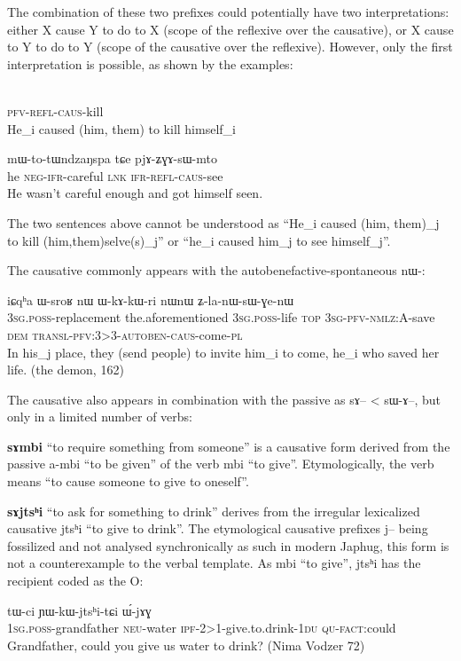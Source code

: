 \documentclass[oldfontcommands,oneside,a4paper,11pt]{article}
\newcommand{\ipa}[1]{{\phon \mbox{#1}}} %
\newcommand{\sg}{\textsc{sg}}
\newcommand{\pl}{\textsc{pl}}
\newcommand{\wav}[1]{}%
\newcommand{\pfv}{\textsc{pfv}}
\newcommand{\auto}{\textsc{autoben}}
\newcommand{\caus}{\textsc{caus}}
\newcommand{\lnk}{\textsc{lnk}}
\newcommand{\dem}{\textsc{dem}}
\newcommand{\du}{\textsc{du}}
\newcommand{\evd}{\textsc{ifr}}
\newcommand{\ipf}{\textsc{ipf}}
\newcommand{\negat}{\textsc{neg}}
\newcommand{\neu}{\textsc{neu}}
\newcommand{\nmlz}{\textsc{nmlz}}
\newcommand{\fact}{\textsc{fact}}
\newcommand{\poss}{\textsc{poss}}
\newcommand{\qu}{\textsc{qu}}
\newcommand{\refl}{\textsc{refl}}
\newcommand{\topic}{\textsc{top}}
\newcommand{\transloc}{\textsc{transl}}
\begin{document}
 The combination of these two prefixes could potentially have two interpretations: either X cause Y to do to X (scope of the reflexive over the causative), or X cause to Y to do to Y (scope of the causative over the reflexive). However, only the first interpretation is possible, as shown by the examples:
\begin{exe}
\ex 
\gll \ipa{pɯ-ʑɣɤ-sɯ-sat}  \\
  \pfv{}-\refl{}-\caus{}-kill \\
\glt   He_i caused (him, them) to kill himself_i
\end{exe}
	\begin{exe}
\ex 
\gll \ipa{ɯʑo} 	\ipa{mɯ-to-tɯndzaŋspa} 	\ipa{tɕe} 	\ipa{pjɤ-ʑɣɤ-sɯ-mto} \\
 he \negat{}-\evd{}-careful \lnk{} \evd{}-\refl{}-\caus{}-see \\
\glt   He wasn't careful enough and got himself seen. \wav{8_ZGAsWmto}
\end{exe}

The two sentences above cannot be understood as  ``He_i caused (him, them)_j to kill (him,them)selve(s)_j'' or ``he_i caused him_j to see himself_j''.


The causative commonly appears with the autobenefactive-spontaneous \ipa{nɯ-}:


 \begin{exe}
\ex 
\gll \ipa{ɯ-sci} 	\ipa{iɕqʰa} 	\ipa{ɯ-sroʁ} 	\ipa{nɯ} 	\ipa{ɯ-kɤ-kɯ-ri} 	\ipa{nɯnɯ} \ipa{ʑ-la-nɯ-sɯ-ɣe-nɯ} \\
3\sg{}.\poss{}-replacement the.aforementioned 3\sg{}.\poss{}-life \topic{} 3\sg{}-\pfv{}-\nmlz{}:A-save \dem{} \transloc{}-\pfv{}:3>3-\auto{}-\caus{}-come-\pl{} \\
\glt In his_j place, they (send people) to invite him_i to come, he_i who saved her life.    (the demon, 162)
\end{exe}

 The causative also appears in combination with the passive as \ipa{sɤ}-- < \ipa{sɯ-ɤ}--, but only in a limited number of verbs:
 
 
  \textbf{\ipa{sɤmbi}} ``to require something from someone'' is a causative form derived from the passive \ipa{a-mbi} ``to be given'' of the verb \ipa{mbi} ``to give''. Etymologically, the verb means ``to cause someone to give to oneself''. 
  
  
  
    \textbf{\ipa{sɤjtsʰi}} ``to ask for something to drink'' derives from the irregular lexicalized causative \ipa{jtsʰi} ``to give to drink''. The etymological causative prefixes \ipa{j}-- being fossilized and not analysed synchronically as such in modern Japhug, this form is not a counterexample to the verbal template. As \ipa{mbi} ``to give'', \ipa{jtsʰi} has the recipient coded as the O:
      \begin{exe}
\ex
\gll   \ipa{a-wɯ} 	\ipa{tɯ-ci} 	\ipa{ɲɯ-kɯ-jtsʰi-tɕi} 	\ipa{ɯ́-jɤɣ}  \\
1\sg{}.\poss{}-grandfather \neu{}-water \ipf{}-2>1-give.to.drink-1\du{} \qu{}-\fact{}:could \\
 \glt Grandfather, could you give us water to drink? (Nima Vodzer 72)
\end{exe}   
 
\end{document}
